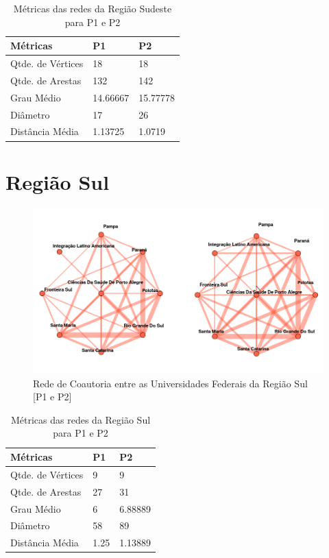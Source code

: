 \documentclass[12pt]{article}
\begin{document}

\begin{table}[H]
\centering
\begin{tabular}{lll}
\hline
\rowcolor[HTML]{C0C0C0} 
\textbf{Métricas} & \textbf{P1} & \textbf{P2} \\ \hline
Qtde. de Vértices & 18          & 18           \\ \hline
Qtde. de Arestas  & 132         & 142          \\ \hline
Grau Médio        & 14.66667    & 15.77778     \\ \hline
Diâmetro          & 17          & 26           \\ \hline
Distância Média   & 1.13725     & 1.0719     \\ \hline
\end{tabular}
\caption{Métricas das redes da Região Sudeste para P1 e P2}
\end{table}


\section{Região Sul}

\begin{figure}[H]
\centering
\includegraphics[scale=0.6]{images/sul.png}
\caption{Rede de Coautoria entre as Universidades Federais da Região Sul [P1 e P2]}
\label{rede-sul}
\end{figure}


\begin{table}[H]
\centering
\begin{tabular}{lll}
\hline
\rowcolor[HTML]{C0C0C0} 
\textbf{Métricas} & \textbf{P1} & \textbf{P2} \\ \hline
Qtde. de Vértices & 9           & 9           \\ \hline
Qtde. de Arestas  & 27          & 31          \\ \hline
Grau Médio        & 6           & 6.88889     \\ \hline
Diâmetro          & 58          & 89           \\ \hline
Distância Média   & 1.25        & 1.13889     \\ \hline
\end{tabular}
\caption{Métricas das redes da Região Sul para P1 e P2}
\end{table}




\end{document}
